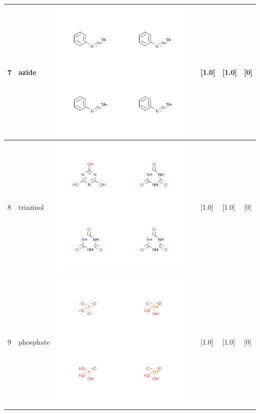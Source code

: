 \begin{longtable}{|l|l|l|l|l|l|l|}
7 & azide & \includegraphics[scale=0.6]{azideMV.png} & & [1.0]& [1.0] & [0] \\
\hline
8 & triazinol & \includegraphics[scale=0.6]{triazinolMV.png} & & [1.0]& [1.0] & [0] \\
\hline
9 & phosphate & \includegraphics[scale=0.6]{phosphateMV.png} & & [1.0]& [1.0] & [0] \\

\end{longtable}
